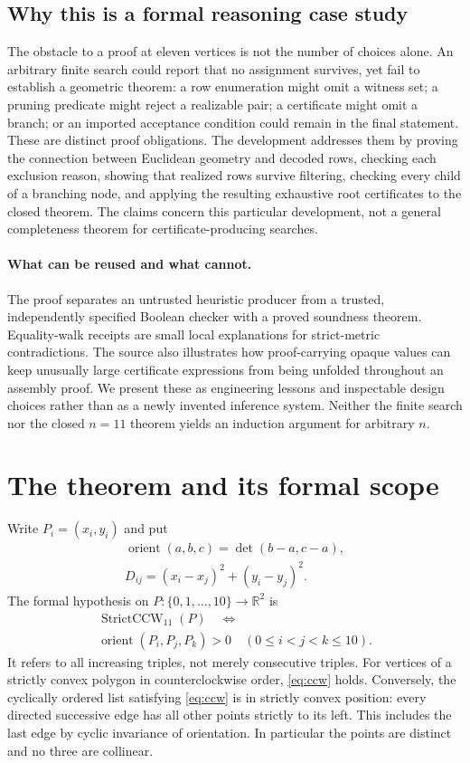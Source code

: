 \documentclass[11pt,a4paper]{article}
\theoremstyle{definition}
\newcommand{\R}{\mathbb R}
\newcommand{\I}{\{0,1,\ldots,10\}}
\newcommand{\orient}{\operatorname{orient}}
\newcommand{\CCW}{\operatorname{StrictCCW}_{11}}
\begin{document}
\subsection{Why this is a formal reasoning case study}
The obstacle to a proof at eleven vertices is not the number of
choices alone. An arbitrary finite search could report that no
assignment survives, yet fail to establish a geometric theorem:
a row enumeration might omit a witness set; a pruning predicate
might reject a realizable pair; a certificate might omit a branch;
or an imported acceptance condition could remain in the final
statement. These are distinct proof obligations. The development
addresses them by proving the connection between Euclidean
geometry and decoded rows, checking each exclusion reason,
showing that realized rows survive filtering, checking every child
of a branching node, and applying the resulting exhaustive root
certificates to the closed theorem. The claims concern this
particular development, not a general completeness theorem for
certificate-producing searches.

\paragraph{What can be reused and what cannot.}
The proof separates an untrusted heuristic producer from a
trusted, independently specified Boolean checker with a proved
soundness theorem. Equality-walk receipts are small local
explanations for strict-metric contradictions. The source also
illustrates how proof-carrying opaque values can keep unusually
large certificate expressions from being unfolded throughout an
assembly proof. We present these as engineering lessons and
inspectable design choices rather than as a newly invented
inference system. Neither the finite search nor the closed
$n=11$ theorem yields an induction argument for arbitrary $n$.

\section{The theorem and its formal scope}\label{sec:statement}
Write $P_i=(x_i,y_i)$ and put
\[
 \begin{gathered}\orient(a,b,c)=\det(b-a,c-a),\\ D_{ij}=(x_i-x_j)^2+(y_i-y_j)^2.\end{gathered}
\]
The formal hypothesis on $P:\I\to\R^2$ is
\begin{equation}\label{eq:ccw}
 \begin{gathered}\CCW(P)\quad\Longleftrightarrow\\ \orient(P_i,P_j,P_k)>0\quad(0\le i<j<k\le10).\end{gathered}
\end{equation}
It refers to all increasing triples, not merely consecutive triples. For vertices of a strictly convex polygon in counterclockwise order, \eqref{eq:ccw} holds. Conversely, the cyclically ordered list satisfying \eqref{eq:ccw} is in strictly convex position: every directed successive edge has all other points strictly to its left. This includes the last edge by cyclic invariance of orientation. In particular the points are distinct and no three are collinear.
\end{document}
